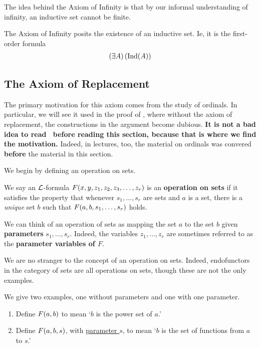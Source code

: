 The idea behind the Axiom of Infinity is that by our informal understanding of infinity, an inductive set cannot be finite.

\begin{baxiom}\label{ZF:Infinity}
    The Axiom of Infinity posits the existence of an inductive set. Ie, it is the first-order formula
    \begin{align*}
        \left( \exists A \right)\left( \operatorname{Ind}(A) \right)
    \end{align*}
\end{baxiom}

\subsection{The Axiom of Replacement}

The primary motivation for this axiom comes from the study of ordinals. In particular, we will see it used in the proof of \sorry, where without the axiom of replacement, the constructions in the argument become dubious. \textbf{It is not a bad idea to read \sorry\ before reading this section, because that is where we find the motivation.} Indeed, in lectures, too, the material on ordinals was convered \textbf{before} the material in this section.

We begin by defining an operation on sets.

\begin{boxdefinition}\label{Ch3:Def:Op_on_Sets}
    We say an $\mathcal{L}$-formula $F\!\left( x, y, z_1, z_2, z_3, \ldots, z_r \right)$ is an \textbf{operation on sets} if it satisfies the property that whenever $s_1, \ldots, s_r$ are sets and $a$ is a set, there is a \textit{unique} set $b$ such that $F\!\left( a, b, s_1, \ldots, s_r \right)$ holds.
\end{boxdefinition}

We can think of an operation of sets as mapping the set $a$ to the set $b$ given \textbf{parameters} $s_1, \ldots, s_r$. Indeed, the variables $z_1, \ldots, z_r$ are sometimes referred to as the \textbf{parameter variables of $F$}.

We are no stranger to the concept of an operation on sets. Indeed, endofunctors in the category of sets are all operations on sets, though these are not the only examples.

\begin{boxexample}
     We give two examples, one without parameters and one with one parameter.
     \begin{enumerate}
         \item Define $F\!\left( a, b \right)$ to mean `$b$ is the power set of $a$.'
         \item Define $F\!\left( a, b, s \right)$, with \underline{parameter $s$}, to mean `$b$ is the set of functions from $a$ to $s$.'
     \end{enumerate}
\end{boxexample}

